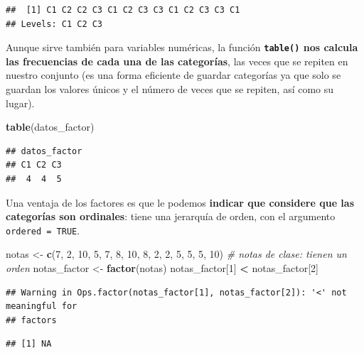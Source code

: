 \documentclass[11pt,]{book}
\newenvironment{Shaded}{\begin{snugshade}}{\end{snugshade}}
\newcommand{\CommentTok}[1]{\textcolor[rgb]{0.37,0.37,0.37}{\textit{#1}}}
\newcommand{\DecValTok}[1]{\textcolor[rgb]{0.06,0.06,0.06}{#1}}
\newcommand{\KeywordTok}[1]{\textcolor[rgb]{0.27,0.27,0.27}{\textbf{#1}}}
\newcommand{\NormalTok}[1]{#1}
\newcommand{\OperatorTok}[1]{\textcolor[rgb]{0.43,0.43,0.43}{\textbf{#1}}}
\newcommand{\StringTok}[1]{\textcolor[rgb]{0.5,0.5,0.5}{#1}}
\begin{document}
\begin{verbatim}
##  [1] C1 C2 C2 C3 C1 C2 C3 C3 C1 C2 C3 C3 C1
## Levels: C1 C2 C3
\end{verbatim}

Aunque sirve también para variables numéricas, la función \textbf{\texttt{table()} nos calcula las frecuencias de cada una de las categorías}, las veces que se repiten en nuestro conjunto (es una forma eficiente de guardar categorías ya que solo se guardan los valores únicos y el número de veces que se repiten, así como su lugar).

\begin{Shaded}
\begin{Highlighting}[]
\KeywordTok{table}\NormalTok{(datos_factor)}
\end{Highlighting}
\end{Shaded}

\begin{verbatim}
## datos_factor
## C1 C2 C3 
##  4  4  5
\end{verbatim}

Una ventaja de los factores es que le podemos \textbf{indicar que considere que las categorías son ordinales}: tiene una jerarquía de orden, con el argumento \texttt{ordered\ =\ TRUE}.

\begin{Shaded}
\begin{Highlighting}[]
\NormalTok{notas <-}\StringTok{ }\KeywordTok{c}\NormalTok{(}\DecValTok{7}\NormalTok{, }\DecValTok{2}\NormalTok{, }\DecValTok{10}\NormalTok{, }\DecValTok{5}\NormalTok{, }\DecValTok{7}\NormalTok{, }\DecValTok{8}\NormalTok{, }\DecValTok{10}\NormalTok{, }\DecValTok{8}\NormalTok{, }\DecValTok{2}\NormalTok{, }\DecValTok{2}\NormalTok{, }\DecValTok{5}\NormalTok{, }\DecValTok{5}\NormalTok{, }\DecValTok{5}\NormalTok{, }\DecValTok{10}\NormalTok{) }\CommentTok{# notas de clase: tienen un orden}
\NormalTok{notas_factor <-}\StringTok{ }\KeywordTok{factor}\NormalTok{(notas)}
\NormalTok{notas_factor[}\DecValTok{1}\NormalTok{] }\OperatorTok{<}\StringTok{ }\NormalTok{notas_factor[}\DecValTok{2}\NormalTok{]}
\end{Highlighting}
\end{Shaded}

\begin{verbatim}
## Warning in Ops.factor(notas_factor[1], notas_factor[2]): '<' not meaningful for
## factors
\end{verbatim}

\begin{verbatim}
## [1] NA
\end{verbatim}
\end{document}
